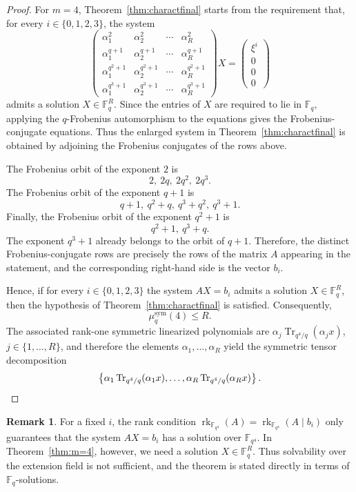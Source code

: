 \documentclass[11pt,a4paper,reqno]{article}
\numberwithin{equation}{section}
\theoremstyle{definition}
\newtheorem{remark}[theorem]{Remark}
\begin{document}
\begin{proof}
For \(m=4\), Theorem~\ref{thm:charactfinal} starts from the requirement that,
for every \(i\in\{0,1,2,3\}\), the system
\[
\begin{pmatrix}
\alpha_1^2 & \alpha_2^2 & \cdots & \alpha_R^2 \\
\alpha_1^{q+1} & \alpha_2^{q+1} & \cdots & \alpha_R^{q+1} \\
\alpha_1^{q^2+1} & \alpha_2^{q^2+1} & \cdots & \alpha_R^{q^2+1} \\
\alpha_1^{q^3+1} & \alpha_2^{q^3+1} & \cdots & \alpha_R^{q^3+1}
\end{pmatrix}
X
=
\begin{pmatrix}
\xi^i\\
0\\
0\\
0
\end{pmatrix}
\]
admits a solution \(X\in\mathbb F_q^R\). Since the entries of \(X\) are
required to lie in \(\mathbb F_q\), applying the \(q\)-Frobenius automorphism
to the equations gives the Frobenius-conjugate equations. Thus the enlarged
system in Theorem~\ref{thm:charactfinal} is obtained by adjoining the
Frobenius conjugates of the rows above.

The Frobenius orbit of the exponent \(2\) is
\[
2,\ 2q,\ 2q^2,\ 2q^3.
\]
The Frobenius orbit of the exponent \(q+1\) is
\[
q+1,\ q^2+q,\ q^3+q^2,\ q^3+1.
\]
Finally, the Frobenius orbit of the exponent \(q^2+1\) is
\[
q^2+1,\ q^3+q.
\]
The exponent \(q^3+1\) already belongs to the orbit of \(q+1\). Therefore,
the distinct Frobenius-conjugate rows are precisely the rows of the matrix
\(A\) appearing in the statement, and the corresponding right-hand side is
the vector \(b_i\).

Hence, if for every \(i\in\{0,1,2,3\}\) the system $AX=b_i$ admits a solution \(X\in\mathbb F_q^R\), then the hypothesis of
Theorem~\ref{thm:charactfinal} is satisfied. Consequently,
\[
\mu_q^{\mathrm{sym}}(4)\le R.
\]
The associated rank-one symmetric linearized polynomials are $\alpha_j\operatorname{Tr}_{q^4/q}(\alpha_jx)$, $j\in\{1,\ldots,R\}$, and therefore the elements \(\alpha_1,\ldots,\alpha_R\) yield the symmetric
tensor decomposition
\[
\left\{
\alpha_1\operatorname{Tr}_{q^4/q}(\alpha_1x),
\ldots,
\alpha_R\operatorname{Tr}_{q^4/q}(\alpha_Rx)
\right\}.\qedhere
\]
\end{proof}  

\begin{remark}
For a fixed \(i\), the rank condition $\operatorname{rk}_{\mathbb F_{q^4}}(A)
=
\operatorname{rk}_{\mathbb F_{q^4}}(A \mid b_i)$ only guarantees that the system \(AX=b_i\) has a solution over
\(\mathbb F_{q^4}\). In Theorem~\ref{thm:m=4}, however, we need a
solution \(X\in\mathbb F_q^R\). Thus solvability over the extension field is
not sufficient, and the theorem is stated directly in terms of
\(\mathbb F_q\)-solutions.
\end{remark}
\end{document}
